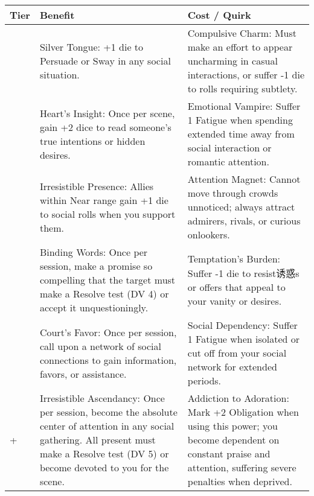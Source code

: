 \begin{longtable}{>{\raggedright\arraybackslash}p{1cm} p{5cm} p{5cm}}
\toprule
\textbf{Tier} & \textbf{Benefit} & \textbf{Cost / Quirk} \\
\midrule
1 & Silver Tongue: +1 die to Persuade or Sway in any social situation. & Compulsive Charm: Must make an effort to appear uncharming in casual interactions, or suffer -1 die to rolls requiring subtlety. \\
\midrule
2 & Heart's Insight: Once per scene, gain +2 dice to read someone's true intentions or hidden desires. & Emotional Vampire: Suffer 1 Fatigue when spending extended time away from social interaction or romantic attention. \\
\midrule
3 & Irresistible Presence: Allies within Near range gain +1 die to social rolls when you support them. & Attention Magnet: Cannot move through crowds unnoticed; always attract admirers, rivals, or curious onlookers. \\
\midrule
4 & Binding Words: Once per session, make a promise so compelling that the target must make a Resolve test (DV 4) or accept it unquestioningly. & Temptation's Burden: Suffer -1 die to resist诱惑s or offers that appeal to your vanity or desires. \\
\midrule
5 & Court's Favor: Once per session, call upon a network of social connections to gain information, favors, or assistance. & Social Dependency: Suffer 1 Fatigue when isolated or cut off from your social network for extended periods. \\
\midrule
6+ & Irresistible Ascendancy: Once per session, become the absolute center of attention in any social gathering. All present must make a Resolve test (DV 5) or become devoted to you for the scene. & Addiction to Adoration: Mark +2 Obligation when using this power; you become dependent on constant praise and attention, suffering severe penalties when deprived. \\
\bottomrule
\end{longtable}